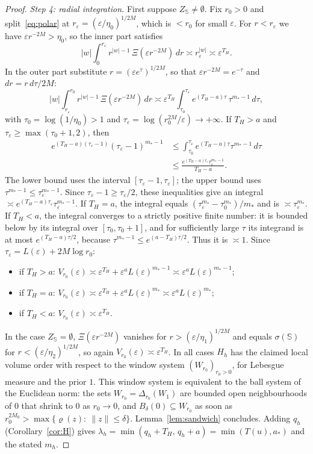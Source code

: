 \documentclass[11pt,a4paper]{article}
\theoremstyle{definition}
\theoremstyle{remark}
\numberwithin{equation}{section}
\newcommand{\norm}[1]{\lVert #1\rVert}
\newcommand{\abs}[1]{\lvert #1\rvert}
\newcommand{\eps}{\varepsilon}
\begin{document}
\begin{proof}
\emph{Step 4: radial integration.} First suppose $Z_{\mathbb S}\neq\emptyset$. Fix $r_0>0$ and split~\eqref{eq:polar} at $r_\eps=(\eps/\eta_0)^{1/2M}$, which is $<r_0$ for small $\eps$. For $r<r_\eps$ we have $\eps r^{-2M}>\eta_0$, so the inner part satisfies
\[
\abs w\int_0^{r_\eps}r^{\abs w-1}\,\Xi(\eps r^{-2M})\,dr\asymp r_\eps^{\abs w}\asymp\eps^{T_H}.
\]
In the outer part substitute $r=(\eps e^\tau)^{1/2M}$, so that $\eps r^{-2M}=e^{-\tau}$ and $dr=r\,d\tau/2M$:
\[
\abs w\int_{r_\eps}^{r_0}r^{\abs w-1}\,\Xi(\eps r^{-2M})\,dr\asymp\eps^{T_H}\int_{\tau_0}^{\tau_\eps}e^{(T_H-a)\tau}\,\tau^{m_*-1}\,d\tau,
\]
with $\tau_0=\log(1/\eta_0)>1$ and $\tau_\eps=\log(r_0^{2M}/\eps)\to+\infty$. If $T_H>a$ and $\tau_\eps\ge\max(\tau_0+1,2)$, then
\begin{align*}
e^{(T_H-a)(\tau_\eps-1)}(\tau_\eps-1)^{m_*-1}
&\le\int_{\tau_0}^{\tau_\eps}e^{(T_H-a)\tau}\tau^{m_*-1}\,d\tau\\
&\le\frac{e^{(T_H-a)\tau_\eps}\tau_\eps^{m_*-1}}{T_H-a}.
\end{align*}
The lower bound uses the interval $[\tau_\eps-1,\tau_\eps]$; the upper bound uses $\tau^{m_*-1}\le\tau_\eps^{m_*-1}$. Since $\tau_\eps-1\ge\tau_\eps/2$, these inequalities give an integral $\asymp e^{(T_H-a)\tau_\eps}\tau_\eps^{m_*-1}$. If $T_H=a$, the integral equals $(\tau_\eps^{m_*}-\tau_0^{m_*})/m_*$ and is $\asymp\tau_\eps^{m_*}$. If $T_H<a$, the integral converges to a strictly positive finite number: it is bounded below by its integral over $[\tau_0,\tau_0+1]$, and for sufficiently large $\tau$ its integrand is at most $e^{(T_H-a)\tau/2}$, because $\tau^{m_*-1}\le e^{(a-T_H)\tau/2}$. Thus it is $\asymp1$. Since $\tau_\eps=L(\eps)+2M\log r_0$:
\begin{itemize}
\item if $T_H>a$: $V_{r_0}(\eps)\asymp\eps^{T_H}+\eps^aL(\eps)^{m_*-1}\asymp\eps^aL(\eps)^{m_*-1}$;
\item if $T_H=a$: $V_{r_0}(\eps)\asymp\eps^{T_H}+\eps^aL(\eps)^{m_*}\asymp\eps^aL(\eps)^{m_*}$;
\item if $T_H<a$: $V_{r_0}(\eps)\asymp\eps^{T_H}$.
\end{itemize}
In the case $Z_{\mathbb S}=\emptyset$, $\Xi(\eps r^{-2M})$ vanishes for $r>(\eps/\eta_1)^{1/2M}$ and equals $\sigma(\mathbb S)$ for $r<(\eps/\eta_2)^{1/2M}$, so again $V_{r_0}(\eps)\asymp\eps^{T_H}$. In all cases $H_h$ has the claimed local volume order with respect to the window system $(W_{r_0})_{r_0>0}$, for Lebesgue measure and the prior $1$. This window system is equivalent to the ball system of the Euclidean norm: the sets $W_{r_0}=\Delta_{r_0}(W_1)$ are bounded open neighbourhoods of $0$ that shrink to $0$ as $r_0\to0$, and $B_\delta(0)\subseteq W_{r_0}$ as soon as $r_0^{2M_0}>\max\{\varrho(z):\ \norm z\le\delta\}$. Lemma~\ref{lem:sandwich} concludes. Adding $q_h$ (Corollary~\ref{cor:H}) gives $\lambda_h=\min(q_h+T_H,\,q_h+a)=\min(T(u),a_*)$ and the stated $m_h$.
\end{proof}
\end{document}
